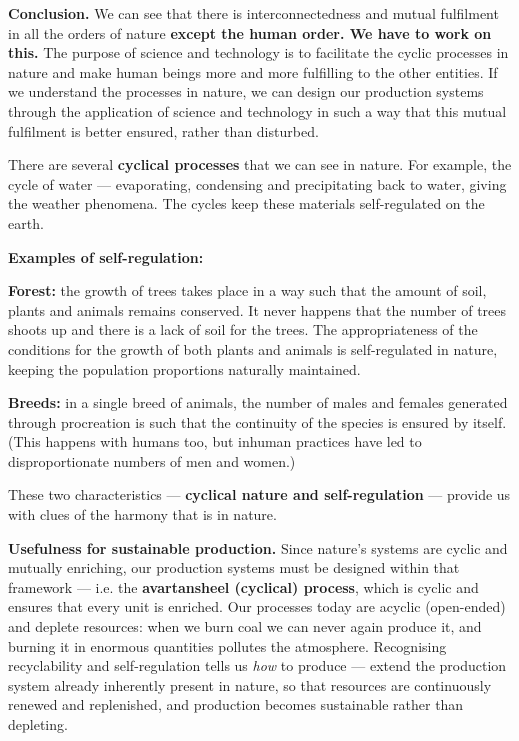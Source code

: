 \textbf{Conclusion.} We can see that there is interconnectedness and mutual
fulfilment in all the orders of nature \textbf{except the human order. We have
to work on this.} The purpose of science and technology is to facilitate the
cyclic processes in nature and make human beings more and more fulfilling to
the other entities. If we understand the processes in nature, we can design
our production systems through the application of science and technology in
such a way that this mutual fulfilment is better ensured, rather than
disturbed.

%
  {}

\ans There are several \textbf{cyclical processes} that we can see in nature.
For example, the cycle of water --- evaporating, condensing and precipitating
back to water, giving the weather phenomena. The cycles keep these materials
self-regulated on the earth.

\textbf{Examples of self-regulation:}

\begin{abul}
\item \textbf{Forest:} the growth of trees takes place in a way such that the
      amount of soil, plants and animals remains conserved. It never happens
      that the number of trees shoots up and there is a lack of soil for the
      trees. The appropriateness of the conditions for the growth of both
      plants and animals is self-regulated in nature, keeping the population
      proportions naturally maintained.
\item \textbf{Breeds:} in a single breed of animals, the number of males and
      females generated through procreation is such that the continuity of the
      species is ensured by itself. (This happens with humans too, but inhuman
      practices have led to disproportionate numbers of men and women.)
\end{abul}

These two characteristics --- \textbf{cyclical nature and self-regulation} ---
provide us with clues of the harmony that is in nature.

\textbf{Usefulness for sustainable production.} Since nature's systems are
cyclic and mutually enriching, our production systems must be designed within
that framework --- i.e. the \textbf{avartansheel (cyclical) process}, which is
cyclic and ensures that every unit is enriched. Our processes today are acyclic
(open-ended) and deplete resources: when we burn coal we can never again
produce it, and burning it in enormous quantities pollutes the atmosphere.
Recognising recyclability and self-regulation tells us \emph{how} to produce
--- extend the production system already inherently present in nature, so that
resources are continuously renewed and replenished, and production becomes
sustainable rather than depleting.

